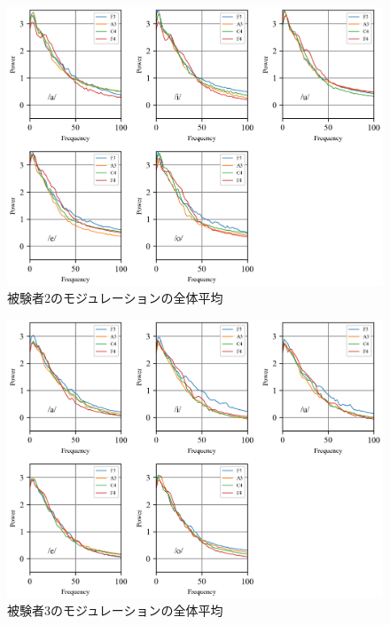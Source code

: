\documentclass[10.5ptj,a4j,dvipdfmx,uplatex, oneside, openany, report, draft]{jsbook}%
\begin{document}
\begin{figure}[htbp]
    \begin{center}
      \includegraphics[clip,width=12.0cm]{long_spectrogram_2.png}
      \caption{被験者2のモジュレーションの全体平均}
      \label{long_spectrogram_2}
    \end{center}
\end{figure}

\begin{figure}[htbp]
    \begin{center}
      \includegraphics[clip,width=12.0cm]{long_spectrogram_3.png}
      \caption{被験者3のモジュレーションの全体平均}
      \label{long_spectrogram_3}
    \end{center}
\end{figure}
\end{document}
